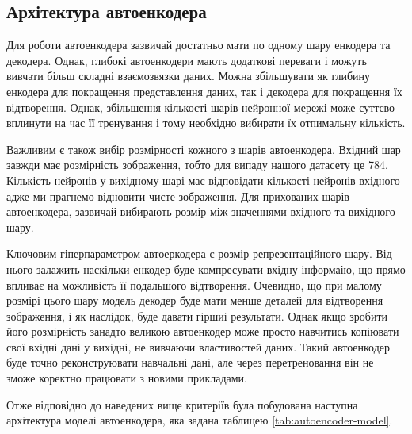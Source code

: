 \documentclass[14pt,a4paper]{extarticle}
\newcounter{e}
\numberwithin{equation}{section}
\numberwithin{figure}{section}
\begin{document}
	
	\subsection{Архітектура автоенкодера}	

	Для роботи автоенкодера зазвичай достатньо мати по одному шару енкодера та декодера. Однак, глибокі автоенкодери мають додаткові переваги і можуть вивчати більш складні взаємозвязки даних. Можна збільшувати як глибину енкодера для покращення представлення даних, так і декодера для покращення їх відтворення. Однак, збільшення кількості шарів нейронної мережі може суттєво вплинути на час її тренування і тому необхідно вибирати їх отпимальну кількість.
		
	Важливим є також вибір розмірності кожного з шарів автоенкодера. Вхідний шар завжди має розмірність зображення, тобто для випаду нашого датасету це 784. Кількість нейронів у вихідному шарі має відповідати кількості нейронів вхідного адже ми прагнемо відновити чисте зображення. Для прихованих шарів автоенкодера, зазвичай вибирають розмір між значеннями вхідного та вихідного шару. 
	
	Ключовим гіперпараметром автоеркодера є розмір репрезентаційного шару. Від нього залажить наскільки енкодер буде компресувати вхідну інформаію, що прямо впливає на можливість її подальшого відтворення. Очевидно, що при малому розмірі цього шару модель декодер буде мати менше деталей для відтворення зображення, і як наслідок, буде давати гіршиі результати.  Однак якщо зробити його розмірність занадто великою автоенкодер може просто навчитись копіювати свої вхідні дані у вихідні, не вивчаючи властивостей даних. Такий автоенкодер буде точно реконструювати навчальні дані, але через перетреновання він не зможе коректно працювати з новими прикладами.
	
	Отже відповідно до наведених вище критеріїв була побудована наступна архітектура моделі автоенкодера, яка задана таблицею \ref{tab:autoencoder-model}.
	
\end{document}
